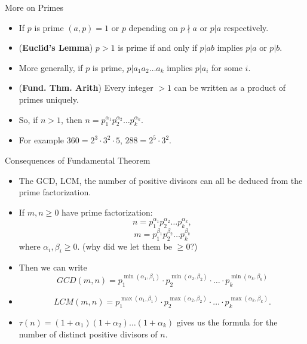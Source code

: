 \documentclass[ %
 usenames,dvipsnames,
aspectratio=169,11pt ]{beamer}
\newenvironment{stepitemize}{\begin{itemize}[<+->]}{\end{itemize} }
\begin{document}
\begin{frame}{More on Primes}
\begin{stepitemize}
\item If $p$ is prime $(a,p)=1$ or $p$ depending on $p\nmid a$ or $p|a$ respectively.
\item ({\bf Euclid's Lemma}) $p>1$ is prime if and only if $p|ab$ implies $p|a$ or $p|b$.
\item More generally, if $p$ is prime, $p|a_1a_2\dots a_k$ implies $p|a_i$ for some $i$.
\item ({\bf Fund. Thm. Arith}) Every integer $>1$ can be written as a product of primes uniquely.
\item So, if $n>1$, then $n=p_1^{\alpha_1}p_2^{\alpha_2}\dots p_k^{\alpha_k}$.
\item For example $360=2^3\cdot 3^2\cdot 5$, $288=2^5\cdot 3^2$.
\end{stepitemize}
\end{frame}

\begin{frame}{Consequences of Fundamental Theorem}
\begin{stepitemize}
\item The GCD, LCM, the number of positive divisors can all be deduced from the prime factorization.
\item If $m,n \geq 0$ have prime factorization:
$$n=p_1^{\alpha_1}p_2^{\alpha_2} \dots p_k^{\alpha_k},$$
$$m=p_1^{\beta_1}p_2^{\beta_2} \dots p_k^{\beta_k}$$
where $\alpha_i, \beta_i \geq 0$. (why did we let them be $\geq 0$?)
\item
Then we can write
$$GCD(m,n) = p_1^{\min(\alpha_1, \beta_1)}\cdot p_2^{\min(\alpha_2, \beta_2)} \cdot \dots \cdot p_k^{\min(\alpha_k, \beta_k)}$$

\item
$$LCM(m,n) = p_1^{\max(\alpha_1, \beta_1)}\cdot p_2^{\max(\alpha_2, \beta_2)} \cdot \dots \cdot p_k^{\max(\alpha_k, \beta_k)}.$$

\item $\tau(n)=(1+\alpha_1)(1+\alpha_2)\dots (1+\alpha_k)$ gives us the formula for the number of distinct positive divisors of $n$.
\end{stepitemize}

\end{frame}
\end{document}
